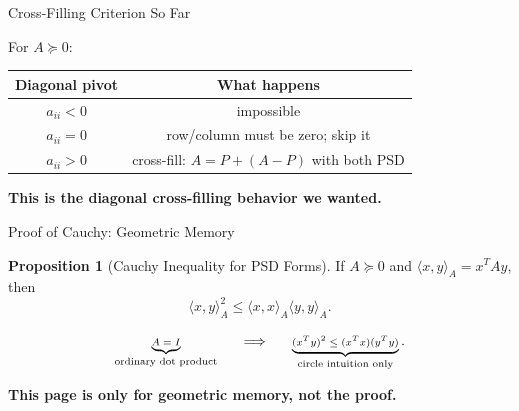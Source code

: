 \documentclass[10pt]{beamer}
\theoremstyle{definition}
\newtheorem{prop}{Proposition}[section]
\newcommand{\x}[1]{\alert{\textbf{#1}}}
\begin{document}
\begin{frame}{Cross-Filling Criterion So Far}

For $A\succeq0$:

\vfill

\begin{center}
\renewcommand{\arraystretch}{1.35}
\begin{tabular}{c|c}
\textbf{Diagonal pivot} & \textbf{What happens}\\
\hline
$a_{ii}<0$ & impossible\\
$a_{ii}=0$ & row/column must be zero; skip it\\
$a_{ii}>0$ & cross-fill: $A=P+(A-P)$ with both PSD
\end{tabular}
\end{center}

\vfill

\begin{center}
\x{This is the diagonal cross-filling behavior we wanted.}
\end{center}

\end{frame}


\begin{frame}{Proof of Cauchy: Geometric Memory}

\begin{prop}[Cauchy Inequality for PSD Forms]
If $A\succeq0$ and $\langle x,y\rangle_A=x^TAy$, then
$$
\boxed{\langle x,y\rangle_A^2
\le
\langle x,x\rangle_A\langle y,y\rangle_A.}
$$
\end{prop}

\vfill

\[
\scriptsize
\underbrace{A=I}_{\text{ordinary dot product}}
\qquad\Longrightarrow\qquad
\underbrace{(x^Ty)^2\le (x^Tx)(y^Ty)}_{\text{circle intuition only}}.
\]

\vfill

\begin{center}
\x{This page is only for geometric memory, not the proof.}
\end{center}

\vfill

\end{frame}
\end{document}
